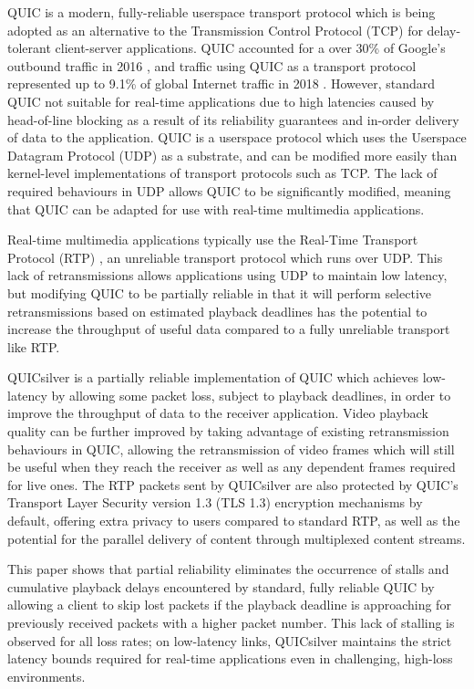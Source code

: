 \documentclass{mpaper}
\begin{document}
QUIC is a modern, fully-reliable userspace transport protocol which is being adopted as an alternative to the Transmission Control Protocol (TCP)\cite{TCP-RFC} for delay-tolerant client-server applications. QUIC accounted for a over 30\% of Google's outbound traffic in 2016 \cite{Langley2017}, and traffic using QUIC as a transport protocol represented up to 9.1\% of global Internet traffic in 2018 \cite{Ruth2018}. However, standard QUIC not suitable for real-time applications due to high latencies caused by head-of-line blocking as a result of its reliability guarantees and in-order delivery of data to the application. QUIC is a userspace protocol which uses the Userspace Datagram Protocol (UDP) \cite{UDP-RFC} as a substrate, and can be modified more easily than kernel-level implementations of transport protocols such as TCP. The lack of required behaviours in UDP allows QUIC to be significantly modified, meaning that QUIC can be adapted for use with real-time multimedia applications.
  
Real-time multimedia applications typically use the Real-Time Transport Protocol (RTP) \cite{RTP-RFC}, an unreliable transport protocol which runs over UDP. This lack of retransmissions allows applications using UDP to maintain low latency, but modifying QUIC to be partially reliable in that it will perform selective retransmissions based on estimated playback deadlines has the potential to increase the throughput of useful data compared to a fully unreliable transport like RTP.

QUICsilver is a partially reliable implementation of QUIC which achieves low-latency by allowing some packet loss, subject to playback deadlines, in order to improve the throughput of data to the receiver application. Video playback quality can be further improved by taking advantage of existing retransmission behaviours in QUIC, allowing the retransmission of video frames which will still be useful when they reach the receiver as well as any dependent frames required for live ones. The RTP packets sent by QUICsilver are also protected by QUIC's Transport Layer Security version 1.3 (TLS 1.3) \cite{TLS-RFC} encryption mechanisms by default, offering extra privacy to users compared to standard RTP, as well as the potential for the parallel delivery of content through multiplexed content streams.
  
This paper shows that partial reliability eliminates the occurrence of stalls and cumulative playback delays encountered by standard, fully reliable QUIC by allowing a client to skip lost packets if the playback deadline is approaching for previously received packets with a higher packet number. This lack of stalling is observed for all loss rates; on low-latency links, QUICsilver maintains the strict latency bounds required for real-time applications even in challenging, high-loss environments.
\end{document}
